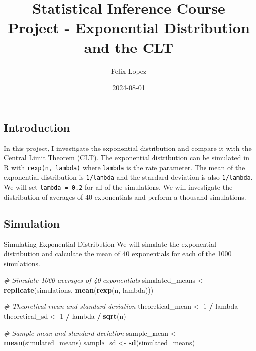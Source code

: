 \documentclass[
]{article}
\title{Statistical Inference Course Project - Exponential Distribution
and the CLT}
\author{Felix Lopez}
\date{2024-08-01}
\newenvironment{Shaded}{\begin{snugshade}}{\end{snugshade}}
\newcommand{\CommentTok}[1]{\textcolor[rgb]{0.56,0.35,0.01}{\textit{#1}}}
\newcommand{\DecValTok}[1]{\textcolor[rgb]{0.00,0.00,0.81}{#1}}
\newcommand{\FunctionTok}[1]{\textcolor[rgb]{0.13,0.29,0.53}{\textbf{#1}}}
\newcommand{\NormalTok}[1]{#1}
\newcommand{\OtherTok}[1]{\textcolor[rgb]{0.56,0.35,0.01}{#1}}
\newcommand{\SpecialCharTok}[1]{\textcolor[rgb]{0.81,0.36,0.00}{\textbf{#1}}}
\begin{document}
\maketitle

\subsection{Introduction}\label{introduction}

In this project, I investigate the exponential distribution and compare
it with the Central Limit Theorem (CLT). The exponential distribution
can be simulated in R with \texttt{rexp(n,\ lambda)} where
\texttt{lambda} is the rate parameter. The mean of the exponential
distribution is \texttt{1/lambda} and the standard deviation is also
\texttt{1/lambda}. We will set \texttt{lambda\ =\ 0.2} for all of the
simulations. We will investigate the distribution of averages of 40
exponentials and perform a thousand simulations.

\subsection{Simulation}\label{simulation}

Simulating Exponential Distribution We will simulate the exponential
distribution and calculate the mean of 40 exponentials for each of the
1000 simulations.

\begin{Shaded}
\begin{Highlighting}[]
\CommentTok{\# Simulate 1000 averages of 40 exponentials}
\NormalTok{simulated\_means }\OtherTok{\textless{}{-}} \FunctionTok{replicate}\NormalTok{(simulations, }\FunctionTok{mean}\NormalTok{(}\FunctionTok{rexp}\NormalTok{(n, lambda)))}

\CommentTok{\# Theoretical mean and standard deviation}
\NormalTok{theoretical\_mean }\OtherTok{\textless{}{-}} \DecValTok{1} \SpecialCharTok{/}\NormalTok{ lambda}
\NormalTok{theoretical\_sd }\OtherTok{\textless{}{-}} \DecValTok{1} \SpecialCharTok{/}\NormalTok{ lambda }\SpecialCharTok{/} \FunctionTok{sqrt}\NormalTok{(n)}

\CommentTok{\# Sample mean and standard deviation}
\NormalTok{sample\_mean }\OtherTok{\textless{}{-}} \FunctionTok{mean}\NormalTok{(simulated\_means)}
\NormalTok{sample\_sd }\OtherTok{\textless{}{-}} \FunctionTok{sd}\NormalTok{(simulated\_means)}
\end{Highlighting}
\end{Shaded}
\end{document}
